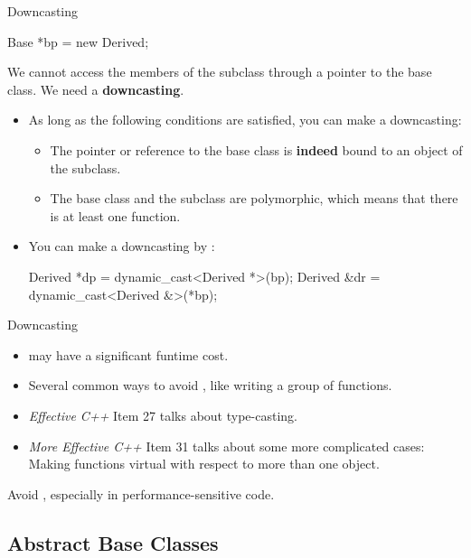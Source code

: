 \documentclass{beamer}
\begin{document}
\begin{frame}[fragile]{Downcasting}
    \begin{cpp}
Base *bp = new Derived{};
    \end{cpp}
    We cannot access the members of the subclass through a pointer to the base class. We need a \textbf{downcasting}.
    \begin{itemize}
        \item As long as the following conditions are satisfied, you can make a downcasting:
        \begin{itemize}
            \item The pointer or reference to the base class is \textbf{indeed} bound to an object of the subclass.
            \item The base class and the subclass are polymorphic, which means that there is at least one \virtual function.
        \end{itemize}
        \item You can make a downcasting by :
        \begin{cpp}
Derived *dp = dynamic_cast<Derived *>(bp);
Derived &dr = dynamic_cast<Derived &>(*bp);
        \end{cpp}
    \end{itemize}
\end{frame}

\begin{frame}{Downcasting}
    \begin{itemize}
        \item {} may have a significant funtime cost.
        \item Several common ways to avoid , like writing a group of \virtual functions.
        \item \textit{Effective C++} Item 27 talks about type-casting.
        \item \textit{More Effective C++} Item 31 talks about some more complicated cases: Making functions virtual with respect to more than one object.
    \end{itemize}
    \begin{notice}
        Avoid , especially in performance-sensitive code.
    \end{notice}
\end{frame}

\subsection{Abstract Base Classes}
\end{document}
